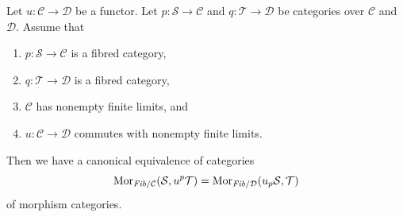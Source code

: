 \begin{lemma}
\label{lemma-adjointness-pullback-pushforward}
Let $u : \mathcal{C} \to \mathcal{D}$ be a functor.
Let $p : \mathcal{S} \to \mathcal{C}$ and $q : \mathcal{T} \to \mathcal{D}$
be categories over $\mathcal{C}$ and $\mathcal{D}$. Assume that
\begin{enumerate}
\item $p : \mathcal{S} \to \mathcal{C}$ is a fibred category,
\item $q : \mathcal{T} \to \mathcal{D}$ is a fibred category,
\item $\mathcal{C}$ has nonempty finite limits, and
\item $u : \mathcal{C} \to \mathcal{D}$ commutes with nonempty finite limits.
\end{enumerate}
Then we have a canonical equivalence of categories
$$
\mathop{\mathrm{Mor}}\nolimits_{\textit{Fib}/\mathcal{C}}(\mathcal{S}, u^p\mathcal{T})
=
\mathop{\mathrm{Mor}}\nolimits_{\textit{Fib}/\mathcal{D}}(u_p\mathcal{S}, \mathcal{T})
$$
of morphism categories.
\end{lemma}

